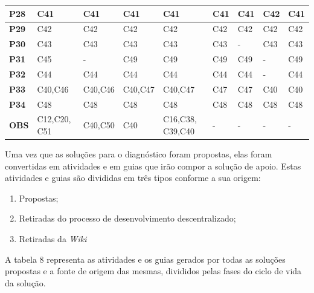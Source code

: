 \begin{longtable}{|M{1.0cm}|M{1.5cm}|M{1.5cm}|M{1.5cm}|M{1.5cm}|M{1.5cm}|M{1.5cm}|M{1.5cm}|M{1.5cm}|}
\textbf{P28} & C41            & C41            & C41            & C41             & C41            & C41            & C42            & C41            \\ \hline
\textbf{P29} & C42            & C42            & C42            & C42             & C42            & C42            & C42            & C42            \\ \hline
\textbf{P30} & C43            & C43            & C43            & C43             & C43            & -              & C43            & C43            \\ \hline
\textbf{P31} & C45            & -              & C49            & C49             & C49            & C49            & -              & C49            \\ \hline
\textbf{P32} & C44            & C44            & C44            & C44             & C44            & C44            & -              & C44            \\ \hline
\textbf{P33} & C40,C46        & C40,C46        & C40,C47        & C40,C47         & C47            & C47            & C40            & C40            \\ \hline
\textbf{P34} & C48            & C48            & C48            & C48             & C48            & C48            & C48            & C48            \\ \hline
\textbf{OBS} & C12,C20, C51    & C40,C50        & C40            & C16,C38, C39,C40 & -              & -              & -              & -              \\ \hline
\end{longtable}

Uma vez que as soluções para o diagnóstico foram propostas, elas foram convertidas em atividades e em guias que irão compor a solução de apoio. Estas atividades e guias são divididas em três tipos conforme a sua origem:
\begin{enumerate}
\item Propostas;
\item Retiradas do processo de desenvolvimento descentralizado;
\item Retiradas da \textit{Wiki}
\end{enumerate}

A tabela 8 representa as atividades e os guias gerados por todas as soluções propostas e a fonte de origem das mesmas, divididos pelas fases do ciclo de vida da solução.\newline

